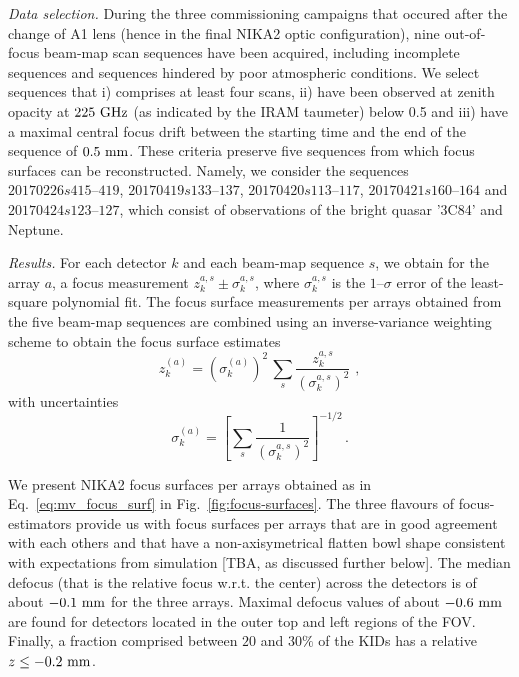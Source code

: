 \emph{Data selection. }
During the three commissioning campaigns that occured after the change of A1
lens (hence in the final NIKA2 optic configuration), nine out-of-focus
beam-map scan sequences have been acquired, including incomplete
sequences and sequences hindered by poor atmospheric conditions. We
select sequences that i) comprises at least four scans, ii) have been
observed at zenith opacity at $225~\rm{GHz}$ (as indicated by
the IRAM taumeter) below 0.5 and iii) have a maximal central focus
drift between the starting time and the end of the sequence of
$0.5~\rm{mm}$. These criteria preserve five sequences from which focus
surfaces can be reconstructed. Namely, we consider the sequences
$20170226s415\mbox{--}419$, $20170419s133\mbox{--}137$, $20170420s113\mbox{--}117$,
$20170421s160\mbox{--}164$ and $20170424s123\mbox{--}127$, which consist of observations
of the bright quasar '3C84' and Neptune.

\emph{Results. }
For each detector $k$ and each beam-map sequence $s$, we obtain for
the array $a$, a focus measurement $z_k^{a, s} \pm \sigma_k^{a, s}$,
where $\sigma_k^{a, s}$ is the $1\mbox{--}\sigma$ error of the least-square
polynomial fit. The focus surface measurements per arrays obtained from the five
beam-map sequences are combined using an inverse-variance weighting
scheme to obtain the focus surface estimates 
\begin{equation}
\label{eq:mv_focus_surf}
z_k^{(a)} = \left( \sigma_k^{(a)} \right)^2 \,  \sum_s \frac{z_k^{a,s}}{\left(\sigma_k^{a,s}\right)^2}\, \,  ,
\end{equation}
with uncertainties 
\begin{equation}
\label{eq:error_mv_focus_surf}
\sigma_k^{(a)} = \left[ \sum_s \frac{1}{\left(\sigma_k^{a,s}\right)^2}\right]^{-1/2}\, .
\end{equation}


We present NIKA2 focus surfaces per arrays obtained as in
Eq.~\ref{eq:mv_focus_surf} 
in Fig.~\ref{fig:focus-surfaces}.
The three flavours of focus-estimators provide us with focus surfaces
per arrays that are in good agreement with each others and that have a
non-axisymetrical flatten bowl shape consistent with expectations from
simulation [TBA, as discussed further below].
The median defocus (that is the relative focus w.r.t. the center)
across the detectors is of about
$-0.1~\rm{mm}$ for the three arrays. Maximal defocus values of about
$-0.6~\rm{mm}$ are found for detectors located in the outer top and
left regions of the FOV. Finally, a fraction comprised between $20$
and $30\%$ of the KIDs has a relative $z\le -0.2~\rm{mm}$.  

